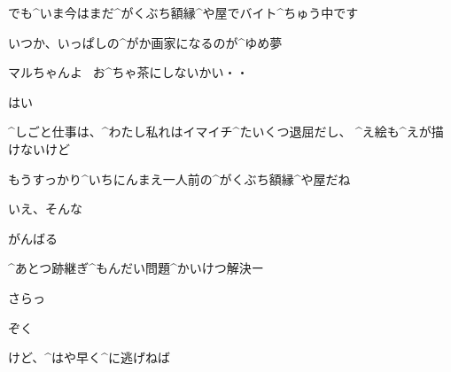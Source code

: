 \Maruko でも^{いま}{今}はまだ^{がくぶち}{額縁}^{や}{屋}でバイト^{ちゅう}{中}です

\Maruko いつか、いっぱしの^{がか}{画家}になるのが^{ゆめ}{夢}

\Person マルちゃんよ
\ お^{ちゃ}{茶}にしないかい・・

\Maruko はい

\Maruko ^{しごと}{仕事}は、^{わたし}{私}れはイマイチ^{たいくつ}{退屈}だし、
^{え}{絵}も^{えが}{描}けないけど

\Person もうすっかり^{いちにんまえ}{一人前}の^{がくぶち}{額縁}^{や}{屋}だね

\Maruko いえ、そんな

\Maruko がんばる

\Person ^{あとつ}{跡継}ぎ^{もんだい}{問題}^{かいけつ}{解決}ー

\Person さらっ

\Maruko ぞく

\Maruko けど、^{はや}{早}く^{に}{逃}げねば

